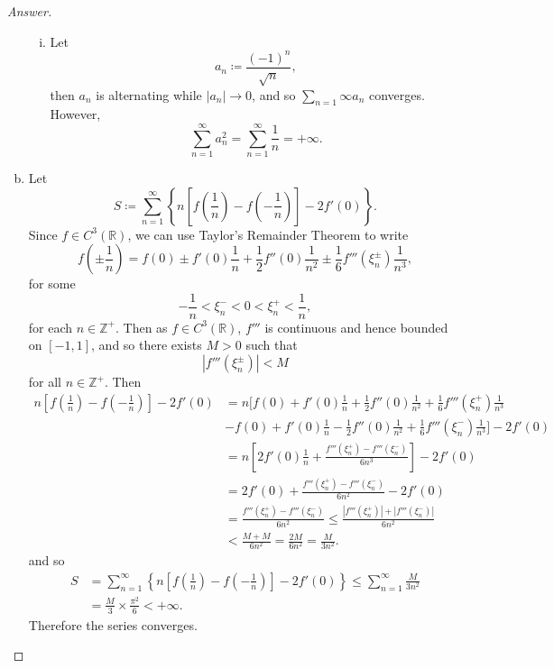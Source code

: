 \documentclass[12pt]{article}
\newcommand{\z}{\mathbb{Z}}
\newcommand{\real}{\mathbb{R}}
\newcommand\paren[1]{\left( #1 \right)}
\newcommand\setb[1]{\left \{ #1 \right \}}
\newcommand{\sqbrack}[1]{\left [ #1 \right ]}
\newcommand{\abs}[1]{\left | #1 \right |}
\theoremstyle{definition}
\begin{document}
\begin{proof}[Answer]
\begin{enumerate}[(a)]
\begin{enumerate}[i.]
            \item Let 
            \[
                a_n \coloneqq \frac{(-1)^n}{\sqrt{n}} , 
            \]
            then $a_n$ is alternating while $\abs{a_n} \to 0$, and so $\sum\limits_{n = 1}{\infty} a_n$ converges. However, 
            \[
                \sum\limits_{n = 1}^{\infty} a_n^2 = \sum\limits_{n = 1}^{\infty} \frac{1}{n} = +\infty . 
            \]
        \end{enumerate}
        \item Let 
        \[
            S \coloneqq \sum\limits_{n = 1}^{\infty} \setb{ n \sqbrack{ f \paren{ \frac{1}{n} } - f \paren{ -\frac{1}{n} } } - 2 f'(0) } . 
        \]
        Since $f \in C^3(\real)$, we can use Taylor's Remainder Theorem to write 
        \[
            f \paren{ \pm \frac{1}{n} } = f(0) \pm f'(0) \frac{1}{n} + \frac{1}{2} f''(0) \frac{1}{n^2} \pm \frac{1}{6} f''' \paren{ \xi^{\pm}_n } \frac{1}{n^3} , 
        \]
        for some 
        \[
            -\frac{1}{n} < \xi^-_n < 0 < \xi^+_n < \frac{1}{n} , 
        \]
        for each $n \in \z^+$. Then as $f \in C^3(\real)$, $f'''$ is continuous and hence bounded on $[-1,1]$, and so there exists $M > 0$ such that 
        \[
            \abs{ f''' \paren{ \xi^{\pm}_n } } < M
        \]
        for all $n \in \z^+$. Then 
        \begin{align*}
            n \sqbrack{ f \paren{ \frac{1}{n} } - f \paren{ -\frac{1}{n} } } - 2 f'(0) & = n \Bigg[ f(0) + f'(0) \frac{1}{n} + \frac{1}{2} f''(0) \frac{1}{n^2} + \frac{1}{6} f''' \paren{ \xi^{+}_n } \frac{1}{n^3} \\ 
            & - f(0) + f'(0) \frac{1}{n} - \frac{1}{2} f''(0) \frac{1}{n^2} + \frac{1}{6} f''' \paren{ \xi^{-}_n } \frac{1}{n^3} \Bigg] - 2 f'(0) \\ 
            & = n \sqbrack{ 2 f'(0) \frac{1}{n} + \frac{ f''' \paren{ \xi^{+}_n } - f''' \paren{ \xi^{-}_n } }{6n^3} } - 2 f'(0) \\
            & = 2 f'(0) + \frac{ f''' \paren{ \xi^{+}_n } - f''' \paren{ \xi^{-}_n } }{6n^2} - 2 f'(0) \\ 
            & = \frac{ f''' \paren{ \xi^{+}_n } - f''' \paren{ \xi^{-}_n } }{6n^2} \leq \frac{ \abs{ f''' \paren{ \xi^{+}_n } } + \abs{ f''' \paren{ \xi^{-}_n } } }{6n^2} \\ 
            & < \frac{ M + M }{6n^2} = \frac{2M}{6n^2} = \frac{M}{3n^2} . 
        \end{align*}
        and so 
        \begin{align*}
            S & = \sum\limits_{n = 1}^{\infty} \setb{ n \sqbrack{ f \paren{ \frac{1}{n} } - f \paren{ -\frac{1}{n} } } - 2 f'(0) } \leq  \sum\limits_{n = 1}^{\infty} \frac{M}{3n^2} \\ 
            & = \frac{M}{3} \times \frac{\pi^2}{6} < +\infty . 
        \end{align*}
        Therefore the series converges. 
    \end{enumerate}
\end{proof}
\end{document}
